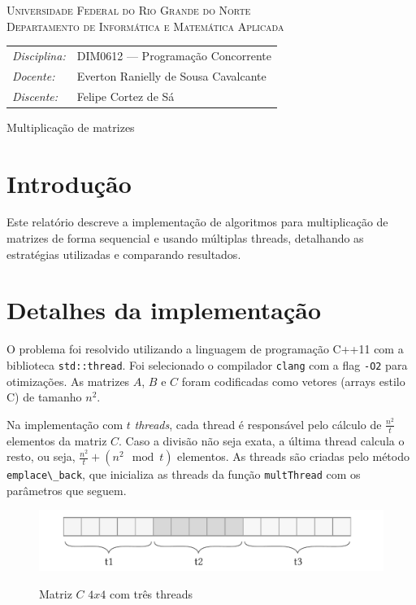 \documentclass[12pt, a4paper]{article}
\newcommand{\code}[1]{{\lstinline{#1}}}
\begin{document}
\begin{center}
    \textsc{Universidade Federal do Rio Grande do Norte} \\
    \textsc{Departamento de Informática e Matemática Aplicada}
\end{center}

\bigskip

\begin{tabular}{@{}ll@{}}
    \emph{Disciplina:} & DIM0612 --- Programação Concorrente \\
    \emph{Docente:}    & Everton Ranielly de Sousa Cavalcante \\
    \emph{Discente:}   & Felipe Cortez de Sá \\
\end{tabular}

\bigskip

\begin{center}
\large Multiplicação de matrizes
\end{center}

\bigskip

\section{Introdução}
Este relatório descreve a implementação de algoritmos para multiplicação de
matrizes de forma sequencial e usando múltiplas threads, detalhando as
estratégias utilizadas e comparando resultados.

\section{Detalhes da implementação}
O problema foi resolvido utilizando a linguagem de programação C++11 com a
biblioteca \code{std::thread}. Foi selecionado o compilador \code{clang}
com a flag \code{-O2} para otimizações. As matrizes $ A $, $ B $ e $ C $ foram
codificadas como vetores (arrays estilo C) de tamanho $ n^2 $.

Na implementação com $ t $ \emph{threads}, cada thread é responsável pelo
cálculo de $ \frac{n^2}{t} $ elementos da matriz $ C $. Caso a divisão não seja
exata, a última thread calcula o resto, ou seja, $ \frac{n^2}{t} + (n^2 \mod t)
$ elementos. As threads são criadas pelo método \code{emplace\_back}, que
inicializa as threads da função \code{multThread} com os parâmetros que seguem.

\begin{figure}[h]
\centering
\includegraphics[width=.7\textwidth]{diagram_1}
\label{fig:f1}
\caption{Matriz $ C $ $ 4x4 $ com três threads}
\end{figure}
\end{document}

